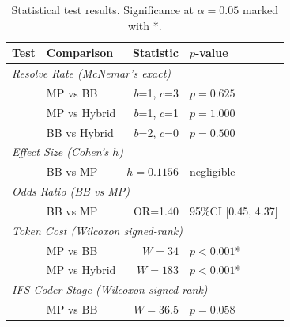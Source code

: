 \begin{table}[t]
\centering
\caption{Statistical test results. Significance at $\alpha=0.05$ marked with *.}
\label{tab:statistics}
\begin{tabular}{llrl}
\toprule
\textbf{Test} & \textbf{Comparison} & \textbf{Statistic} & \textbf{$p$-value} \\
\midrule
\multicolumn{4}{l}{\textit{Resolve Rate (McNemar's exact)}} \\
 & MP vs BB & $b$=1, $c$=3 & $p=0.625$ \\
 & MP vs Hybrid & $b$=1, $c$=1 & $p=1.000$ \\
 & BB vs Hybrid & $b$=2, $c$=0 & $p=0.500$ \\
\midrule
\multicolumn{4}{l}{\textit{Effect Size (Cohen's $h$)}} \\
 & BB vs MP & $h=0.1156$ & negligible \\
\midrule
\multicolumn{4}{l}{\textit{Odds Ratio (BB vs MP)}} \\
 & BB vs MP & OR=1.40  & 95\%CI [0.45, 4.37] \\
\midrule
\multicolumn{4}{l}{\textit{Token Cost (Wilcoxon signed-rank)}} \\
 & MP vs BB & $W=34$ & $p<0.001$* \\
 & MP vs Hybrid & $W=183$ & $p<0.001$* \\
\midrule
\multicolumn{4}{l}{\textit{IFS Coder Stage (Wilcoxon signed-rank)}} \\
 & MP vs BB & $W=36.5$ & $p=0.058$ \\
\bottomrule
\end{tabular}
\end{table}
